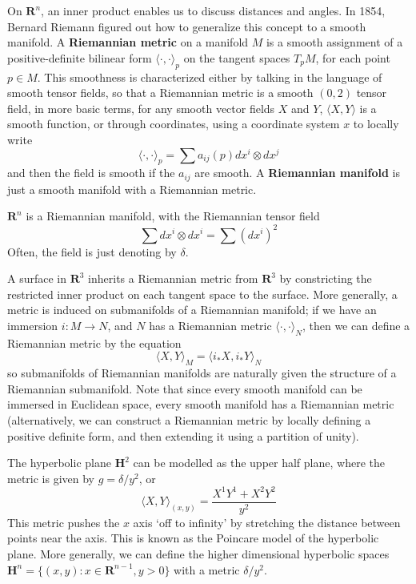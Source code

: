 On $\mathbf{R}^n$, an inner product enables us to discuss distances and angles. In 1854, Bernard Riemann figured out how to generalize this concept to a smooth manifold. A {\bf Riemannian metric} on a manifold $M$ is a smooth assignment of a positive-definite bilinear form $\langle \cdot, \cdot \rangle_p$ on the tangent spaces $T_p M$, for each point $p \in M$. This smoothness is characterized either by talking in the language of smooth tensor fields, so that a Riemannian metric is a smooth $(0,2)$ tensor field, in more basic terms, for any smooth vector fields $X$ and $Y$, $\langle X, Y \rangle$ is a smooth function, or through coordinates, using a coordinate system $x$ to locally write
%
\[ \langle \cdot, \cdot \rangle_p = \sum a_{ij}(p) dx^i \otimes dx^j \]
%
and then the field is smooth if the $a_{ij}$ are smooth. A {\bf Riemannian manifold} is just a smooth manifold with a Riemannian metric.

\begin{example}
    $\mathbf{R}^n$ is a Riemannian manifold, with the Riemannian tensor field
    \[ \sum dx^i \otimes dx^i = \sum (dx^i)^2 \]
    Often, the field is just denoting by $\delta$.
\end{example}

\begin{example}
    A surface in $\mathbf{R}^3$ inherits a Riemannian metric from $\mathbf{R}^3$ by constricting the restricted inner product on each tangent space to the surface. More generally, a metric is induced on submanifolds of a Riemannian manifold; if we have an immersion $i: M \to N$, and $N$ has a Riemannian metric $\langle \cdot, \cdot \rangle_N$, then we can define a Riemannian metric by the equation
    \[ \langle X, Y \rangle_M = \langle i_*X, i_*Y \rangle_N \]
    so submanifolds of Riemannian manifolds are naturally given the structure of a Riemannian submanifold. Note that since every smooth manifold can be immersed in Euclidean space, every smooth manifold has a Riemannian metric (alternatively, we can construct a Riemannian metric by locally defining a positive definite form, and then extending it using a partition of unity).
\end{example}

\begin{example}
    The hyperbolic plane $\mathbf{H}^2$ can be modelled as the upper half plane, where the metric is given by $g = \delta/y^2$, or
    \[ \langle X, Y \rangle_{(x,y)} = \frac{X^1Y^1 + X^2Y^2}{y^2} \]
    This metric pushes the $x$ axis `off to infinity' by stretching the distance between points near the axis. This is known as the Poincare model of the hyperbolic plane. More generally, we can define the higher dimensional hyperbolic spaces $\mathbf{H}^n = \{ (x,y): x \in \mathbf{R}^{n-1}, y > 0 \}$ with a metric $\delta/y^2$.
\end{example}

